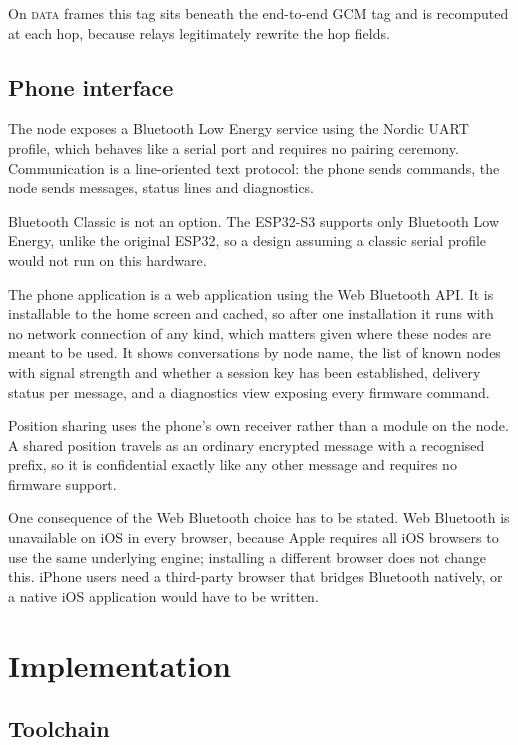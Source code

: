 \documentclass[12pt,a4paper,oneside]{report}
\begin{document}
On \textsc{data} frames this tag sits beneath the end-to-end GCM tag and is
recomputed at each hop, because relays legitimately rewrite the hop fields.

\section{Phone interface}

The node exposes a Bluetooth Low Energy service using the Nordic UART profile,
which behaves like a serial port and requires no pairing ceremony. Communication
is a line-oriented text protocol: the phone sends commands, the node sends
messages, status lines and diagnostics.

Bluetooth Classic is not an option. The ESP32-S3 supports only Bluetooth Low
Energy, unlike the original ESP32, so a design assuming a classic serial profile
would not run on this hardware.

The phone application is a web application using the Web Bluetooth API. It is
installable to the home screen and cached, so after one installation it runs with
no network connection of any kind, which matters given where these nodes are
meant to be used. It shows conversations by node name, the list of known nodes
with signal strength and whether a session key has been established, delivery
status per message, and a diagnostics view exposing every firmware command.

Position sharing uses the phone's own receiver rather than a module on the node.
A shared position travels as an ordinary encrypted message with a recognised
prefix, so it is confidential exactly like any other message and requires no
firmware support.

One consequence of the Web Bluetooth choice has to be stated. Web Bluetooth is
unavailable on iOS in every browser, because Apple requires all iOS browsers to
use the same underlying engine; installing a different browser does not change
this. iPhone users need a third-party browser that bridges Bluetooth natively, or
a native iOS application would have to be written.

\chapter{Implementation}

\section{Toolchain}
\end{document}
